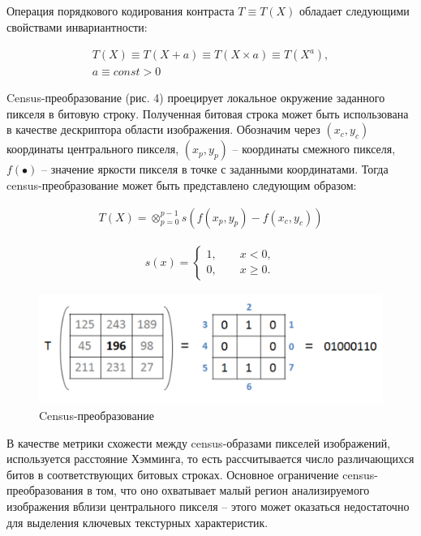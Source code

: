 Операция   порядкового   кодирования   контраста $T \equiv T(X)$ обладает  следующими свойствами инвариантности:

\begin{gather}
T(X) \equiv T(X+a) \equiv T(X \times a) \equiv T(X^a), \\
a \equiv const > 0 \nonumber
\end{gather}

Census-преобразование (рис. 4) проецирует локальное окружение заданного  пикселя  в  битовую  строку.  Полученная  битовая  строка  может быть использована  в  качестве  дескриптора  области  изображения. Обозначим  через $(x_c, y_c)$ координаты  центрального  пикселя, $(x_p, y_p)$ -- координаты  смежного пикселя, $f(\bullet)$ -- значение яркости пикселя в точке с заданными координатами. Тогда census-преобразование может быть представлено следующим образом:

\begin{gather}
T(X) = \otimes_{p=0}^{p-1}s(f(x_p, y_p)-f(x_c, y_c))
\end{gather}

\begin{gather}
s(x) =
  \begin{cases}
    1,\qquad x < 0,\\
    0,\qquad x \ge 0.
 \end{cases}
\end{gather}

\begin{figure}[h!]
\centering
\includegraphics[scale=0.35]{res/pic004}
\caption{Census-преобразование}
\end{figure}

В качестве метрики схожести между census-образами пикселей изображений, используется расстояние Хэмминга, то есть рассчитывается число различающихся битов  в  соответствующих  битовых строках.  Основное  ограничение census-преобразования  в  том,  что  оно  охватывает малый  регион  анализируемого изображения вблизи центрального пикселя -- этого может оказаться недостаточно для выделения ключевых текстурных характеристик.

